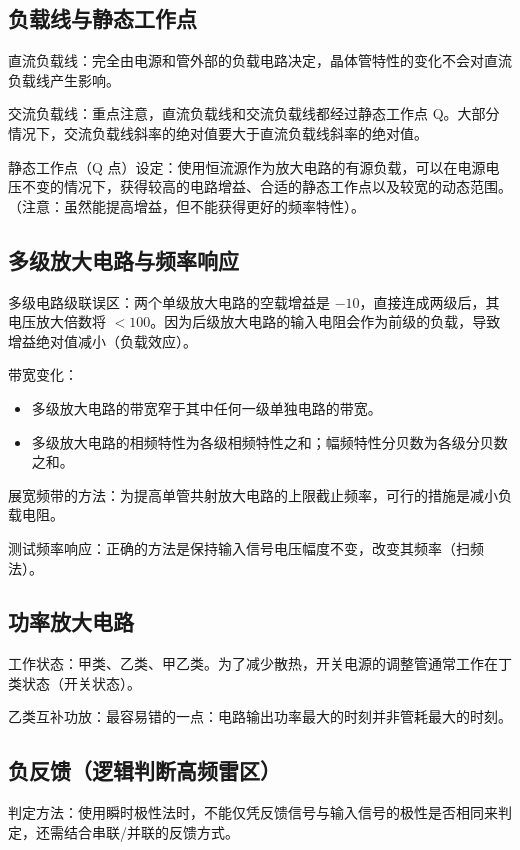\documentclass[UTF8,fontset=fandol,zihao=5]{ctexart}
\begin{document}
{\subsection{负载线与静态工作点}

直流负载线：完全由电源和管外部的负载电路决定，晶体管特性的变化不会对直流负载线产生影响。

交流负载线：重点注意，直流负载线和交流负载线都经过静态工作点 Q。大部分情况下，交流负载线斜率的绝对值要大于直流负载线斜率的绝对值。

静态工作点（Q 点）设定：使用恒流源作为放大电路的有源负载，可以在电源电压不变的情况下，获得较高的电路增益、合适的静态工作点以及较宽的动态范围。（注意：虽然能提高增益，但不能获得更好的频率特性）。

\subsection{多级放大电路与频率响应}

多级电路级联误区：两个单级放大电路的空载增益是 $-10$，直接连成两级后，其电压放大倍数将 $<100$。因为后级放大电路的输入电阻会作为前级的负载，导致增益绝对值减小（负载效应）。

带宽变化：
\begin{itemize}
  \item 多级放大电路的带宽窄于其中任何一级单独电路的带宽。
  \item 多级放大电路的相频特性为各级相频特性之和；幅频特性分贝数为各级分贝数之和。
\end{itemize}

展宽频带的方法：为提高单管共射放大电路的上限截止频率，可行的措施是减小负载电阻。

测试频率响应：正确的方法是保持输入信号电压幅度不变，改变其频率（扫频法）。

\subsection{功率放大电路}

工作状态：甲类、乙类、甲乙类。为了减少散热，开关电源的调整管通常工作在丁类状态（开关状态）。

乙类互补功放：最容易错的一点：电路输出功率最大的时刻并非管耗最大的时刻。

\subsection{负反馈（逻辑判断高频雷区）}

判定方法：使用瞬时极性法时，不能仅凭反馈信号与输入信号的极性是否相同来判定，还需结合串联/并联的反馈方式。

}
\end{document}
